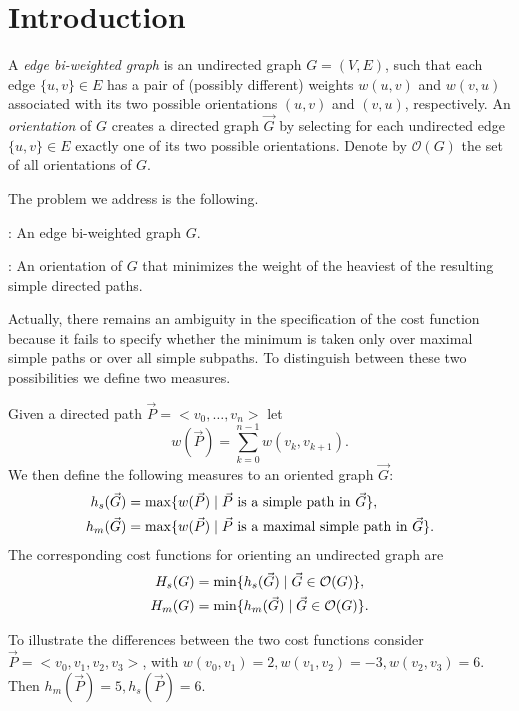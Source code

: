 \section{Introduction}

A \emph{edge bi-weighted graph} is an undirected graph $G = (V, E)$, such that each edge $\{u, v\} \in E$ has a pair of (possibly different) weights $w(u, v)$ and $w(v, u)$ associated with its two possible orientations $(u, v)$ and $(v, u)$, respectively. An \emph{orientation} 
of $G$ creates a directed graph $\vec{G}
$ 
by selecting for each undirected edge $\{u, v\} \in E$ exactly one of its two possible orientations. Denote by $\mathcal{O}(G)$ the set of all orientations of $G$. 

The problem we address is the following.

: An edge bi-weighted graph $G$.

: An orientation  of $G$ that minimizes the weight of 
the heaviest of the resulting simple directed paths.

Actually, there remains an ambiguity in the specification of the cost function because it 
fails to specify whether the minimum is taken only over maximal 
simple paths or over all simple subpaths. To distinguish between these two possibilities we define two measures.

\begin{definition}
	Given a directed path $\vec{P}=<v_0,\ldots,v_n>$ let 
	\begin{equation}\label{e.h}
		w(\vec{P})=\sum_{k=0}^{n-1} w(v_k,v_{k+1}).
	\end{equation}
	We then define the following measures to an oriented graph $\vec{G}$:
	\begin{align} 
		h_s(\vec{G}) &= \max\{w(\vec{P})\mid \vec{P} \mbox{ is a simple path in }\vec{G} \}, \\
		h_m(\vec{G}) &= \max\{w(\vec{P})\mid \vec{P} \mbox{ is a maximal simple path in }\vec{G} \}.
	\end{align}
	The corresponding cost functions for orienting an undirected graph are 
	\begin{align}
		H_s(G) &= \min\{h_s(\vec{G})\mid \vec{G} \in \mathcal{O}(G)\}, \\
		H_m(G) &= \min\{h_m(\vec{G})\mid \vec{G} \in \mathcal{O}(G)\}.
	\end{align}
\end{definition}

 To illustrate the differences between the two cost functions consider\\
 $\vec{P}=<v_0,v_1,v_2,v_3>$, with $w(v_0,v_1)=2, w(v_1,v_2)=-3,w(v_2,v_3)=6$.
 Then $h_m(\vec{P})=5, h_s(\vec{P})=6$.


